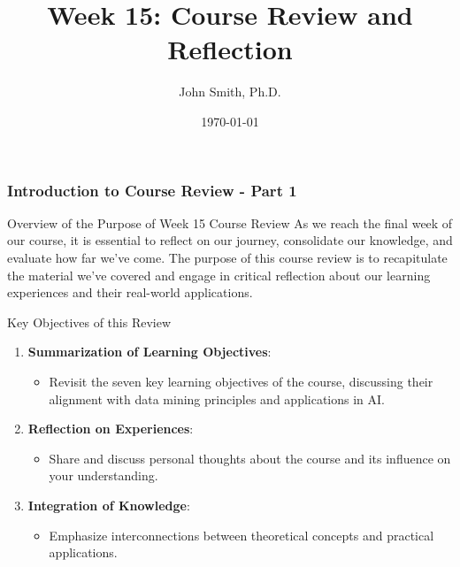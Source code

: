 \documentclass[aspectratio=169]{beamer}
\title[Course Review]{Week 15: Course Review and Reflection}
\author[J. Smith]{John Smith, Ph.D.}
\institute[University Name]{
  Department of Computer Science\\
  University Name\\
  \vspace{0.3cm}
  Email: email@university.edu\\
  Website: www.university.edu
}
\date{\today}
\begin{document}
\frame{\titlepage}

\begin{frame}[fragile]
    \frametitle{Introduction to Course Review - Part 1}
    \begin{block}{Overview of the Purpose of Week 15 Course Review}
        As we reach the final week of our course, it is essential to reflect on our journey, consolidate our knowledge, and evaluate how far we've come. The purpose of this course review is to recapitulate the material we've covered and engage in critical reflection about our learning experiences and their real-world applications.
    \end{block}
    
    \begin{block}{Key Objectives of this Review}
        \begin{enumerate}
            \item \textbf{Summarization of Learning Objectives}:
                \begin{itemize}
                    \item Revisit the seven key learning objectives of the course, discussing their alignment with data mining principles and applications in AI.
                \end{itemize}
            \item \textbf{Reflection on Experiences}:
                \begin{itemize}
                    \item Share and discuss personal thoughts about the course and its influence on your understanding.
                \end{itemize}
            \item \textbf{Integration of Knowledge}:
                \begin{itemize}
                    \item Emphasize interconnections between theoretical concepts and practical applications.
                \end{itemize}
        \end{enumerate}
    \end{block}
\end{frame}
\end{document}
